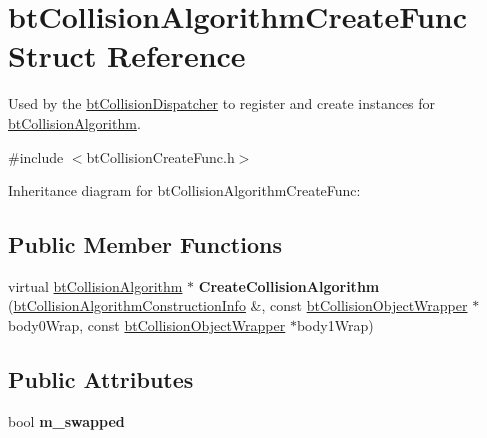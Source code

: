\hypertarget{structbt_collision_algorithm_create_func}{\section{bt\+Collision\+Algorithm\+Create\+Func Struct Reference}
\label{structbt_collision_algorithm_create_func}
}


Used by the \hyperlink{classbt_collision_dispatcher}{bt\+Collision\+Dispatcher} to register and create instances for \hyperlink{classbt_collision_algorithm}{bt\+Collision\+Algorithm}.  




{\ttfamily \#include $<$bt\+Collision\+Create\+Func.\+h$>$}



Inheritance diagram for bt\+Collision\+Algorithm\+Create\+Func\+:
\subsection*{Public Member Functions}
\begin{DoxyCompactItemize}
\item 
\hypertarget{structbt_collision_algorithm_create_func_ad13b8166d51f2174d70676f038493cfd}{virtual \hyperlink{classbt_collision_algorithm}{bt\+Collision\+Algorithm} $\ast$ {\bfseries Create\+Collision\+Algorithm} (\hyperlink{structbt_collision_algorithm_construction_info}{bt\+Collision\+Algorithm\+Construction\+Info} \&, const \hyperlink{structbt_collision_object_wrapper}{bt\+Collision\+Object\+Wrapper} $\ast$body0\+Wrap, const \hyperlink{structbt_collision_object_wrapper}{bt\+Collision\+Object\+Wrapper} $\ast$body1\+Wrap)}\label{structbt_collision_algorithm_create_func_ad13b8166d51f2174d70676f038493cfd}

\end{DoxyCompactItemize}
\subsection*{Public Attributes}
\begin{DoxyCompactItemize}
\item 
\hypertarget{structbt_collision_algorithm_create_func_adbcd40f1d695f060dcb527942686e670}{bool {\bfseries m\+\_\+swapped}}\label{structbt_collision_algorithm_create_func_adbcd40f1d695f060dcb527942686e670}

\end{DoxyCompactItemize}


